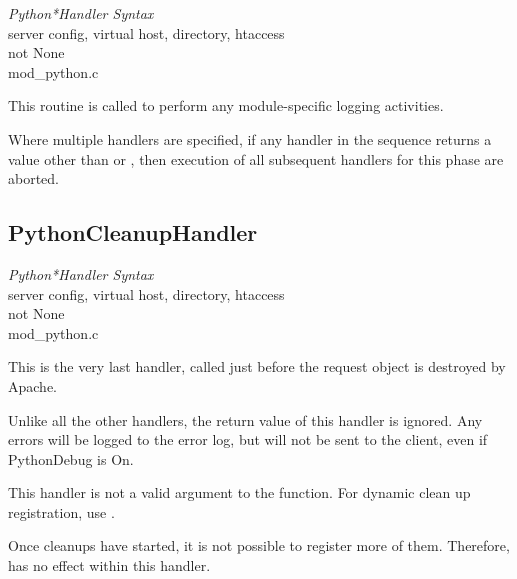 \emph{Python*Handler Syntax}\\
server config, virtual host, directory, htaccess\\
not None\\
mod_python.c

This routine is called to perform any module-specific logging
activities.

Where multiple handlers are specified, if any handler in the sequence
returns a value other than  or , then
execution of all subsequent handlers for this phase are aborted.

\subsection{PythonCleanupHandler\label{dir-handlers-pch}}

\emph{Python*Handler Syntax}\\
server config, virtual host, directory, htaccess\\
not None\\
mod_python.c

This is the very last handler, called just before the request object
is destroyed by Apache.

Unlike all the other handlers, the return value of this handler is
ignored. Any errors will be logged to the error log, but will not be
sent to the client, even if PythonDebug is On.

This handler is not a valid argument to the 
function. For dynamic clean up registration, use
.

Once cleanups have started, it is not possible to register more of
them. Therefore,  has no effect within this
handler.

